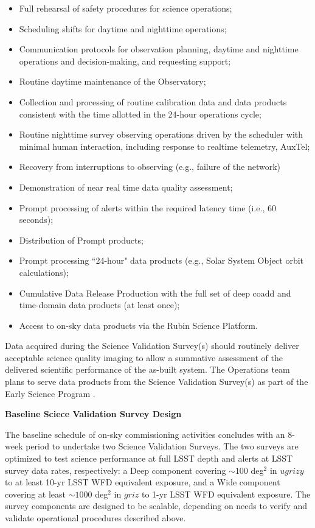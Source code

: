 \begin{itemize}
\item Full rehearsal of safety procedures for science operations;
\item Scheduling shifts for daytime and nighttime operations;
\item Communication protocols for observation planning, daytime and nighttime operations and decision-making, and requesting support;
\item Routine daytime maintenance of the Observatory;
\item Collection and processing of routine calibration data and data products consistent with the time allotted in the 24-hour operations cycle;
\item Routine nighttime survey observing operations driven by the scheduler with minimal human interaction, including response to realtime telemetry, AuxTel;
\item Recovery from interruptions to observing (e.g., failure of the network)
\item Demonstration of near real time data quality assessment;
\item Prompt processing of alerts within the required latency time (i.e., 60 seconds);
\item Distribution of Prompt products;
\item Prompt processing ``24-hour" data products (e.g., Solar System Object orbit calculations);
\item Cumulative Data Release Production with the full set of deep coadd and time-domain data products (at least once);
\item Access to on-sky data products via the Rubin Science Platform.
\end{itemize}

Data acquired during the Science Validation Survey(s) should routinely deliver acceptable science quality imaging to allow a summative assessment of the delivered scientific performance of the as-built system.
The Operations team plans to serve data products from the Science Validation Survey(s) as part of the Early Science Program .


\textbf{Baseline Sciece Validation Survey Design}

The baseline schedule of on-sky commissioning activities concludes with an 8-week period to undertake two Science Validation Surveys.
The two surveys are optimized to test science performance at full LSST depth and alerts at LSST survey data rates, respectively: a Deep component covering $\sim100$ deg$^2$ in $ugrizy$ to at least 10-yr LSST WFD equivalent exposure, and a Wide component covering at least $\sim1000$ deg$^2$ in $griz$ to 1-yr LSST WFD equivalent exposure.
The survey components are designed to be scalable, depending on needs to verify and validate operational procedures described above.

